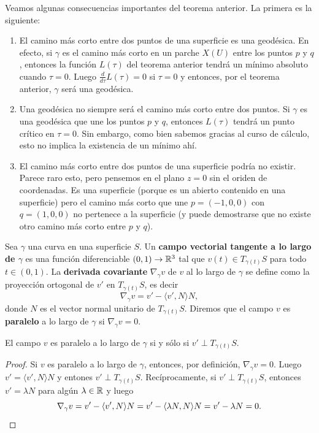Veamos algunas consecuencias importantes del teorema anterior. La primera es la
siguiente: 
\begin{enumerate}
	\item El camino más corto entre dos puntos de una superficie es una
		geodésica. En efecto, si $\gamma$ es el camino más corto en un
		parche $X(U)$ entre los puntos $p$ y $q$, entonces la función $L(\tau)$
		del teorema anterior tendrá un mínimo absoluto cuando $\tau=0$. Luego
		$\frac{d}{d\tau}L(\tau)=0$ si $\tau=0$ y entonces, por el teorema
		anterior, $\gamma$ será una geodésica. 
	\item Una geodésica no siempre será el camino más corto entre dos puntos. 
		Si $\gamma$ es una geodésica que une los puntos $p$ y $q$, entonces
		$L(\tau)$ tendrá un punto crítico en $\tau=0$. Sin embargo, como bien
		sabemos gracias al curso de cálculo, esto no implica la existencia de
		un mínimo ahí. 
	\item El camino más corto entre dos puntos de una superficie podría no existir. Parece raro esto, pero
		pensemos en el plano $z=0$ sin el oriden de coordenadas. Es una superficie (porque es un abierto contenido en una superficie) 
		pero el camino más corto que une $p=(-1,0,0)$ con $q=(1,0,0)$ no pertenece a la superficie (y puede demostrarse
		que no existe otro camino más corto entre $p$ y $q$).


\end{enumerate}


Sea $\gamma$ una curva en una superficie $S$. Un \textbf{campo vectorial
tangente a lo largo de $\gamma$} es una función diferenciable $(0,1)\to\mathbb{R}^3$
tal que $v(t)\in T_{\gamma(t)}S$ para todo $t\in(0,1)$. La \textbf{derivada
covariante} $\nabla_\gamma v$ de $v$ al lo largo de $\gamma$ se define como la proyección ortogonal 
de $v'$ en $T_{\gamma(t)}S$, es decir
\[
	\nabla_{\gamma}v=v'-\langle v',N\rangle N,
\]
donde $N$ es el vector normal unitario de $T_{\gamma(t)}S$. Diremos que el
campo $v$ es \textbf{paralelo} a lo largo de $\gamma$ si $\nabla_{\gamma}v=0$.

\begin{proposition}
	El campo $v$ es paralelo a lo largo de $\gamma$ si y sólo si $v'\perp
	T_{\gamma(t)}S$.
\end{proposition}

\begin{proof}
	Si $v$ es paralelo a lo largo de $\gamma$, entonces, por definición,
	$\nabla_{\gamma}v=0$. Luego $v'=\langle v',N\rangle N$ y entones $v'\perp
	T_{\gamma(t)}S$. Recíprocamente, si $v'\perp T_{\gamma(t)}S$, entonces
	$v'=\lambda N$ para algún $\lambda\in\mathbb{R}$ y luego
	\[
		\nabla_{\gamma}v=v'-\langle v',N\rangle N=v'-\langle \lambda N,N\rangle N=v'-\lambda N=0.\qedhere
	\]
\end{proof}

